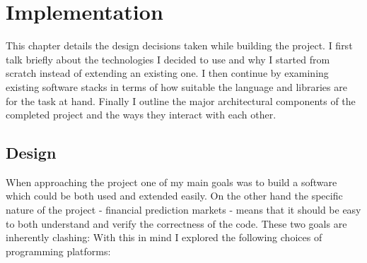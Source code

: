 \documentclass[bsc,frontabs,twoside,singlespacing,parskip,deptreport]{infthesis}     %
\begin{document}
\chapter{Implementation}
	This chapter details the design decisions taken while building the project. I first talk briefly about the technologies I decided to use and why I started from scratch instead of extending an existing one. I then continue by examining existing software stacks in terms of how suitable the language and libraries are for the task at hand. Finally I outline the major architectural components of the completed project and the ways they interact with each other. 

\section{Design}

	When approaching the project one of my main goals was to build a software which could be both used and extended easily. On the other hand the specific nature of the project - financial prediction markets - means that it should be easy to both understand and verify the correctness of the code. These two goals are inherently clashing: 
With this in mind I explored the following choices of programming platforms:
\end{document}
